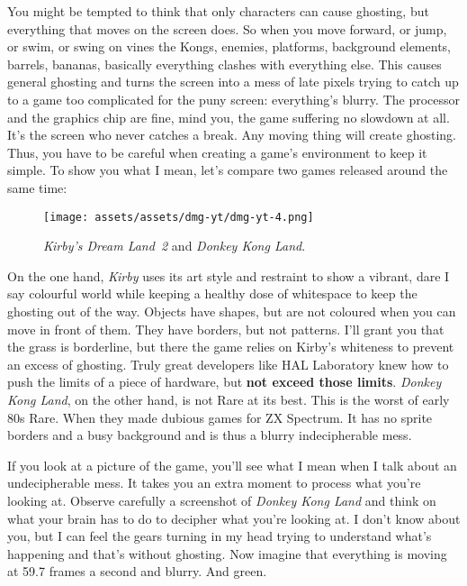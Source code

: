 \documentclass{book}
\begin{document}
You might be tempted to think that only characters can cause ghosting, but everything that moves on the screen does. So when you move forward, or jump, or swim, or swing on vines the Kongs, enemies, platforms, background elements, barrels, bananas, basically everything clashes with everything else. This causes general ghosting and turns the screen into a mess of late pixels trying to catch up to a game too complicated for the puny screen: everything’s blurry. The processor and the graphics chip are fine, mind you, the game suffering no slowdown at all. It’s the screen who never catches a break. Any moving thing will create ghosting. Thus, you have to be careful when creating a game’s environment to keep it simple. To show you what I mean, let’s compare two games released around the same time:

\begin{figure}[hbt]
\vskip 10pt
\centering \texttt{[image: assets/assets/dmg-yt/dmg-yt-4.png]}\par\pagetwodescription \emph{Kirby’s Dream Land~2} and \emph{Donkey Kong Land}.
\vskip 6pt
\end{figure}

On the one hand, \emph{Kirby} uses its art style and restraint to show a vibrant, dare I say colourful world while keeping a healthy dose of whitespace to keep the ghosting out of the way. Objects have shapes, but are not coloured when you can move in front of them. They have borders, but not patterns. I’ll grant you that the grass is borderline, but there the game relies on Kirby’s whiteness to prevent an excess of ghosting. Truly great developers like HAL Laboratory knew how to push the limits of a piece of hardware, but \textbf{not exceed those limits}. \emph{Donkey Kong Land}, on the other hand, is not Rare at its best. This is the worst of early 80s Rare. When they made dubious games for ZX Spectrum. It has no sprite borders and a busy background and is thus a blurry indecipherable mess.

If you look at a picture of the game, you’ll see what I mean when I talk about an undecipherable mess. It takes you an extra moment to process what you’re looking at. Observe carefully a screenshot of \emph{Donkey Kong Land} and think on what your brain has to do to decipher what you’re looking at. I don’t know about you, but I can feel the gears turning in my head trying to understand what’s happening and that’s without ghosting. Now imagine that everything is moving at 59.7 frames a second and blurry. And green.
\end{document}
